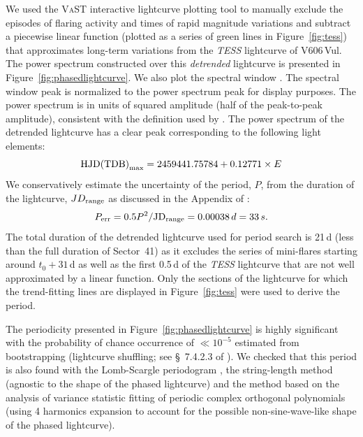 \documentclass[twocolumn]{aastex631}
\newcommand{\nova}{V606\,Vul}
\begin{document}
We used the \textsc{VaST} interactive lightcurve plotting tool 
to manually exclude the episodes of flaring activity and times of rapid
magnitude variations and subtract a piecewise linear function (plotted as a
series of green lines in Figure~\ref{fig:tess}) that approximates long-term variations from the {\em TESS} lightcurve of \nova{}.
The power spectrum \citep{1975Ap&SS..36..137D,2018ApJS..236...16V} constructed over this {\it detrended} lightcurve is
presented in Figure~\ref{fig:phasedlightcurve}. We also plot the spectral
window
\citep[see][]{1975Ap&SS..36..137D,1982ApJ...263..835S,2018ApJS..236...16V,2022ApJ...927..214G}.
The spectral window peak is normalized to the power spectrum peak for
display purposes. The power spectrum is in units of squared amplitude 
(half of the peak-to-peak amplitude), consistent with the definition used by 
\cite{2014MNRAS.445..437M}. 
The power spectrum of the detrended lightcurve has a clear peak corresponding to the following light elements:
\begin{equation}
{\rm HJD(TDB)}_{\rm max} = 2459441.75784 + 0.12771 \times E
\label{eq:lightelements}
\end{equation}
We conservatively estimate the uncertainty of the period, $P$, 
from the duration of the lightcurve, $JD_{\rm range}$ 
as discussed in the Appendix of \cite{2022ApJ...934..142S}:
\begin{equation}
P_{\rm err} = 0.5 P^2/{\rm JD}_{\rm range} = 0.00038\,d = 33\,s.
\label{eq:perror}
\end{equation}
The total duration of the detrended lightcurve used for period search is
21\,d (less than the full duration of Sector~41) as it excludes the series of mini-flares starting around $t_0 + 31$\,d
as well as the first 0.5\,d of the {\em TESS} lightcurve that are not well
approximated by a linear function. Only the sections of the lightcurve for
which the trend-fitting lines are displayed in Figure~\ref{fig:tess} were used
to derive the period.

The periodicity presented in Figure~\ref{fig:phasedlightcurve} is highly significant with the probability of chance occurrence
of $\ll 10^{-5}$ estimated from bootstrapping (lightcurve shuffling; see \S~7.4.2.3 of \citealt{2018ApJS..236...16V}).
We checked that this period is also found with the Lomb-Scargle
periodogram \citep[analytically computed false alarm probability $\ll 10^{-5}$;][]{1976Ap&SS..39..447L,1982ApJ...263..835S,2018ApJS..236...16V},  
the \cite{1965ApJS...11..216L} string-length method 
(agnostic to the shape of the phased lightcurve) 
and the \cite{1996ApJ...460L.107S} method based on the analysis of variance statistic 
fitting of periodic complex orthogonal polynomials 
(using 4 harmonics expansion to account for the possible non-sine-wave-like shape of the phased lightcurve).
\end{document}
